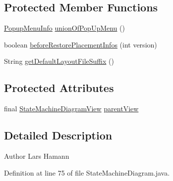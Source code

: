 \subsection*{Protected Member Functions}
\begin{DoxyCompactItemize}
\item 
\hyperlink{classorg_1_1tzi_1_1use_1_1gui_1_1views_1_1diagrams_1_1_diagram_view_1_1_popup_menu_info}{Popup\-Menu\-Info} \hyperlink{classorg_1_1tzi_1_1use_1_1gui_1_1views_1_1diagrams_1_1statemachine_1_1_state_machine_diagram_a092a033162055b575c9d6223f4352a73}{union\-Of\-Pop\-Up\-Menu} ()
\item 
boolean \hyperlink{classorg_1_1tzi_1_1use_1_1gui_1_1views_1_1diagrams_1_1statemachine_1_1_state_machine_diagram_ae73abc77c3db3e4fcc507d4ef3736a22}{before\-Restore\-Placement\-Infos} (int version)
\item 
String \hyperlink{classorg_1_1tzi_1_1use_1_1gui_1_1views_1_1diagrams_1_1statemachine_1_1_state_machine_diagram_a7d84070afa878e6cbb0c6bba8c02db10}{get\-Default\-Layout\-File\-Suffix} ()
\end{DoxyCompactItemize}
\subsection*{Protected Attributes}
\begin{DoxyCompactItemize}
\item 
final \hyperlink{classorg_1_1tzi_1_1use_1_1gui_1_1views_1_1diagrams_1_1statemachine_1_1_state_machine_diagram_view}{State\-Machine\-Diagram\-View} \hyperlink{classorg_1_1tzi_1_1use_1_1gui_1_1views_1_1diagrams_1_1statemachine_1_1_state_machine_diagram_a75a1431072f781446498c676bfb94584}{parent\-View}
\end{DoxyCompactItemize}


\subsection{Detailed Description}
\begin{DoxyAuthor}{Author}
Lars Hamann 
\end{DoxyAuthor}


Definition at line 75 of file State\-Machine\-Diagram.\-java.



